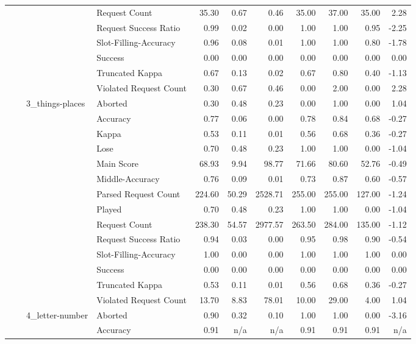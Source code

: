 \begin{tabular}{llllrrrrrrr}
 &  &  & Request Count & 35.30 & 0.67 & 0.46 & 35.00 & 37.00 & 35.00 & 2.28 \\
 &  &  & Request Success Ratio & 0.99 & 0.02 & 0.00 & 1.00 & 1.00 & 0.95 & -2.25 \\
 &  &  & Slot-Filling-Accuracy & 0.96 & 0.08 & 0.01 & 1.00 & 1.00 & 0.80 & -1.78 \\
 &  &  & Success & 0.00 & 0.00 & 0.00 & 0.00 & 0.00 & 0.00 & 0.00 \\
 &  &  & Truncated Kappa & 0.67 & 0.13 & 0.02 & 0.67 & 0.80 & 0.40 & -1.13 \\
 &  &  & Violated Request Count & 0.30 & 0.67 & 0.46 & 0.00 & 2.00 & 0.00 & 2.28 \\
\cline{3-11}
 &  & \multirow[t]{14}{*}{3_things-places} & Aborted & 0.30 & 0.48 & 0.23 & 0.00 & 1.00 & 0.00 & 1.04 \\
 &  &  & Accuracy & 0.77 & 0.06 & 0.00 & 0.78 & 0.84 & 0.68 & -0.27 \\
 &  &  & Kappa & 0.53 & 0.11 & 0.01 & 0.56 & 0.68 & 0.36 & -0.27 \\
 &  &  & Lose & 0.70 & 0.48 & 0.23 & 1.00 & 1.00 & 0.00 & -1.04 \\
 &  &  & Main Score & 68.93 & 9.94 & 98.77 & 71.66 & 80.60 & 52.76 & -0.49 \\
 &  &  & Middle-Accuracy & 0.76 & 0.09 & 0.01 & 0.73 & 0.87 & 0.60 & -0.57 \\
 &  &  & Parsed Request Count & 224.60 & 50.29 & 2528.71 & 255.00 & 255.00 & 127.00 & -1.24 \\
 &  &  & Played & 0.70 & 0.48 & 0.23 & 1.00 & 1.00 & 0.00 & -1.04 \\
 &  &  & Request Count & 238.30 & 54.57 & 2977.57 & 263.50 & 284.00 & 135.00 & -1.12 \\
 &  &  & Request Success Ratio & 0.94 & 0.03 & 0.00 & 0.95 & 0.98 & 0.90 & -0.54 \\
 &  &  & Slot-Filling-Accuracy & 1.00 & 0.00 & 0.00 & 1.00 & 1.00 & 1.00 & 0.00 \\
 &  &  & Success & 0.00 & 0.00 & 0.00 & 0.00 & 0.00 & 0.00 & 0.00 \\
 &  &  & Truncated Kappa & 0.53 & 0.11 & 0.01 & 0.56 & 0.68 & 0.36 & -0.27 \\
 &  &  & Violated Request Count & 13.70 & 8.83 & 78.01 & 10.00 & 29.00 & 4.00 & 1.04 \\
\cline{3-11}
 &  & \multirow[t]{14}{*}{4_letter-number} & Aborted & 0.90 & 0.32 & 0.10 & 1.00 & 1.00 & 0.00 & -3.16 \\
 &  &  & Accuracy & 0.91 & n/a & n/a & 0.91 & 0.91 & 0.91 & n/a \\

\end{tabular}
